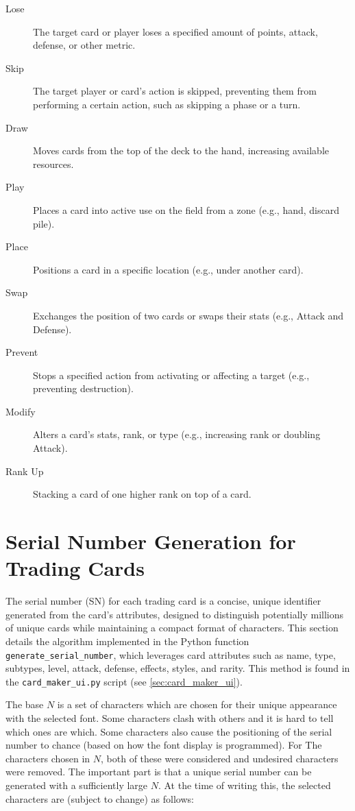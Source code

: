 \begin{description}
	\item[Lose] The target card or player loses a specified amount of points, attack, defense, or other metric.  
	\item[Skip] The target player or card’s action is skipped, preventing them from performing a certain action, such as skipping a phase or a turn.
	\item[Draw] Moves cards from the top of the deck to the hand, increasing available resources.
	\item[Play] Places a card into active use on the field from a zone (e.g., hand, discard pile).
	\item[Place] Positions a card in a specific location (e.g., under another card).
	\item[Swap] Exchanges the position of two cards or swaps their stats (e.g., Attack and Defense).
	\item[Prevent] Stops a specified action from activating or affecting a target (e.g., preventing destruction).
	\item[Modify] Alters a card’s stats, rank, or type (e.g., increasing rank or doubling Attack).
	\item[Rank Up] Stacking a card of one higher rank on top of a card.
\end{description}















\section{Serial Number Generation for Trading Cards}
\label{sec:serial_number_generation}

The serial number (SN) for each trading card is a concise, unique identifier generated from the card's attributes, designed to distinguish potentially millions of unique cards while maintaining a compact format of characters. This section details the algorithm implemented in the Python function \texttt{generate\_serial\_number}, which leverages card attributes such as name, type, subtypes, level, attack, defense, effects, styles, and rarity. This method is found in the \texttt{card\_maker\_ui.py} script (see \ref{sec:card_maker_ui}).

The base $N$ is a set of characters which are chosen for their unique appearance with the selected font. Some characters clash with others and it is hard to tell which ones are which. Some characters also cause the positioning of the serial number to chance (based on how the font display is programmed). For The characters chosen in $N$, both of these were considered and undesired characters were removed. The important part is that a unique serial number can be generated with a sufficiently large $N$. At the time of writing this, the selected characters are (subject to change) as follows:

